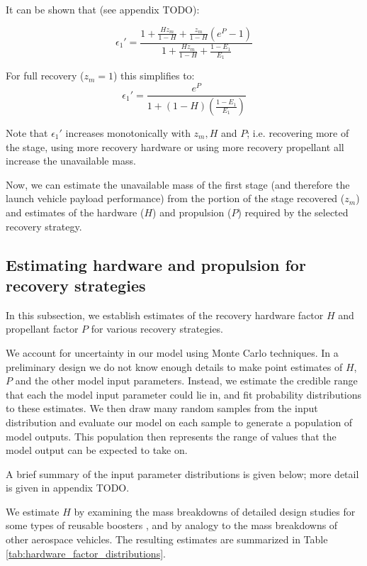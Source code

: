 \documentclass[conf]{new-aiaa}
\begin{document}
It can be shown that (see appendix TODO):

\begin{equation}
\label{eq:eps_h_p_z}
\epsilon_1' = \frac{1 + \frac{H z_m}{1 - H} +  \frac{z_m}{1 - H} (e^P - 1) }{1 + \frac{H z_m}{1 - H} + \frac{1 - E_1}{E_1} }
\end{equation}

For full recovery ($z_m = 1$) this simplifies to:
\begin{equation}
\epsilon_1' = \frac{e^P}{1 + (1 - H) \left( \frac{1 - E_1}{E_1} \right)}
\end{equation}

Note that $\epsilon_1'$ increases monotonically with $z_m, H$ and $P$; i.e. recovering more of the stage, using more recovery hardware or using more recovery propellant all increase the unavailable mass.

Now, we can estimate the unavailable mass of the first stage (and therefore the launch vehicle payload performance) from the portion of the stage recovered ($z_m$) and estimates of the hardware ($H$) and propulsion ($P$) required by the selected recovery strategy. 

\subsection{Estimating hardware and propulsion for recovery strategies}
In this subsection, we establish estimates of the recovery hardware factor $H$ and propellant factor $P$ for various recovery strategies.

We account for uncertainty in our model using Monte Carlo techniques. In a preliminary design we do not know enough details to make point estimates of $H$, $P$ and the other model input parameters. Instead, we estimate the credible range that each the model input parameter could lie in, and fit probability distributions to these estimates. We then draw many random samples from the input distribution and evaluate our model on each sample to generate a population of model outputs. This population then represents the range of values that the model output can be expected to take on.

A brief summary of the input parameter distributions is given below; more detail is given in appendix TODO.

We estimate $H$ by examining the mass breakdowns of detailed design studies for some types of reusable boosters \cite{Healy1998, Isakowitz2004, Sippel2003, Hellman2005}, and by analogy to the mass breakdowns of other aerospace vehicles. The resulting estimates are summarized in Table \ref{tab:hardware_factor_distributions}.
\end{document}

